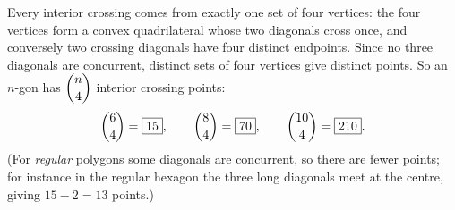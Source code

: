 Every interior crossing comes from exactly one set of four vertices: the four vertices form a convex quadrilateral whose two diagonals cross once, and conversely two crossing diagonals have four distinct endpoints. Since no three diagonals are concurrent, distinct sets of four vertices give distinct points. So an $n$-gon has $\dbinom n4$ interior crossing points:
\[
\dbinom64=\boxed{15},\qquad\dbinom84=\boxed{70},\qquad\dbinom{10}4=\boxed{210}.
\]
(For \emph{regular} polygons some diagonals are concurrent, so there are fewer points; for instance in the regular hexagon the three long diagonals meet at the centre, giving $15-2=13$ points.)
